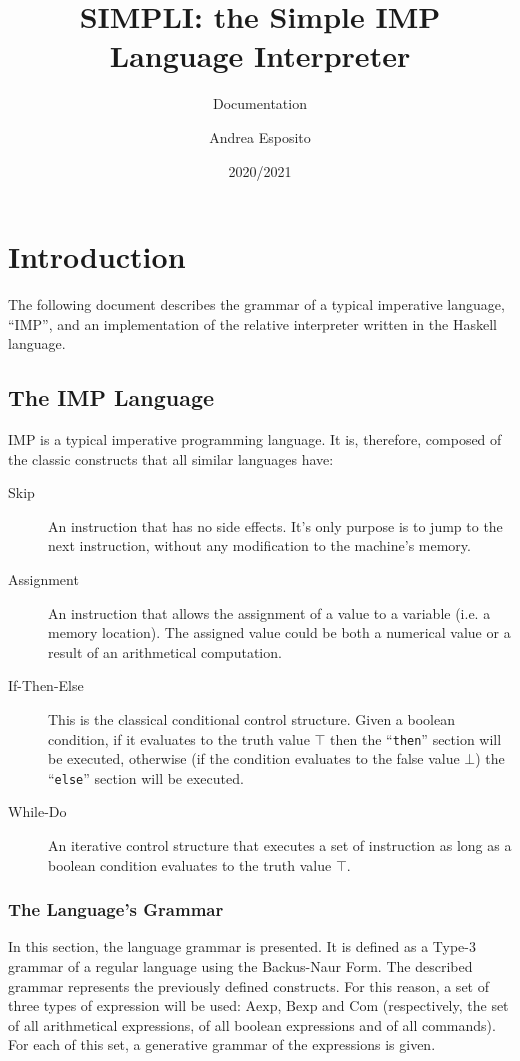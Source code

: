 \documentclass{esposito-documentation}
\title{SIMPLI: the Simple IMP Language Interpreter}
\subtitle{Documentation}
\author{Andrea Esposito}
\date{2020/2021}
\begin{document}
\frontmatter
\maketitle
\colophon
\tableofcontents

\mainmatter
\chapter{Introduction}

The following document describes the grammar of a typical imperative language,
``IMP'', and an implementation of the relative interpreter written in the
Haskell language.

\section{The IMP Language}

IMP is a typical imperative programming language. It is, therefore, composed of the classic constructs that all similar languages have:
\begin{description}
	\item[Skip] An instruction that has no side effects. It's only purpose is
		to jump to the next instruction, without any modification to the
		machine's memory.
	\item[Assignment] An instruction that allows the assignment of a value to a
		variable (i.e. a memory location). The assigned value could be both a
		numerical value or a result of an arithmetical computation.
	\item[If-Then-Else] This is the classical conditional control structure.
		Given a boolean condition, if it evaluates to the truth value $\top$
		then the ``\texttt{then}'' section will be executed, otherwise (if the
		condition evaluates to the false value $\bot$) the ``\texttt{else}''
		section will be executed.
	\item[While-Do] An iterative control structure that executes a set of
		instruction as long as a boolean condition evaluates to the truth value
		$\top$.
\end{description}

\subsection{The Language's Grammar}

In this section, the language grammar is presented. It is defined as a Type-3
grammar of a regular language using the Backus-Naur Form. The described grammar
represents the previously defined constructs. For this reason, a set of three
types of expression will be used: $\mathrm{Aexp}$, $\mathrm{Bexp}$ and
$\mathrm{Com}$ (respectively, the set of all arithmetical expressions, of all
boolean expressions and of all commands). For each of this set, a generative
grammar of the expressions is given.
\end{document}

